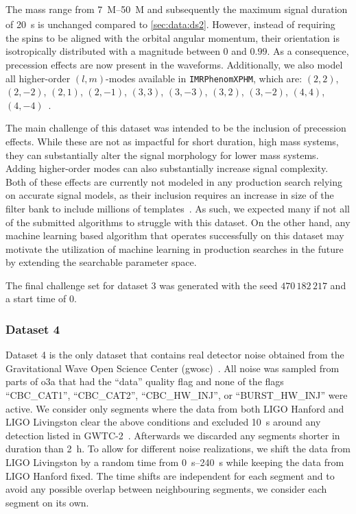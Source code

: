 The mass range from \SIrange{7}{50}{M_\odot} and subsequently the maximum signal duration of \SI{20}{\second} is unchanged compared to \autoref{sec:data:ds2}. However, instead of requiring the spins to be aligned with the orbital angular momentum, their orientation is isotropically distributed with a magnitude between $0$ and $0.99$. As a consequence, precession effects are now present in the waveforms. Additionally, we also model all higher-order $(l,m)$-modes available in \verb|IMRPhenomXPHM|, which are: $(2, 2)$, $(2, -2)$, $(2, 1)$, $(2, -1)$, $(3, 3)$, $(3, -3)$, $(3, 2)$, $(3, -2)$, $(4, 4)$, $(4, -4)$~\cite{Pratten:2020ceb}.

The main challenge of this dataset was intended to be the inclusion of precession effects. While these are not as impactful for short duration, high mass systems, they can substantially alter the signal morphology for lower mass systems. Adding higher-order modes can also substantially increase signal complexity. Both of these effects are currently not modeled in any production search relying on accurate signal models, as their inclusion requires an increase in size of the filter bank to include millions of templates~\cite{Harry:2016ijz, Harry:2017weg}. As such, we expected many if not all of the submitted algorithms to struggle with this dataset. On the other hand, any machine learning based algorithm that operates successfully on this dataset may motivate the utilization of machine learning in production searches in the future by extending the searchable parameter space.

The final challenge set for dataset 3 was generated with the seed $470\,182\,217$ and a start time of $0$.

\subsubsection{Dataset 4}
Dataset 4 is the only dataset that contains real detector noise obtained from the Gravitational Wave Open Science Center (\acrshort{gwosc})~\cite{LIGOScientific:2019lzm}. All noise was sampled from parts of \acrshort{o3a} that had the ``data'' quality flag and none of the flags ``CBC\_CAT1'', ``CBC\_CAT2'', ``CBC\_HW\_INJ'', or ``BURST\_HW\_INJ'' were active. We consider only segments where the data from both LIGO Hanford and LIGO Livingston clear the above conditions and excluded \SI{10}{\second} around any detection listed in GWTC-2~\cite{LIGOScientific:2020ibl}. Afterwards we discarded any segments shorter in duration than \SI{2}{\hour}. To allow for different noise realizations, we shift the data from LIGO Livingston by a random time from \SIrange{0}{240}{\second} while keeping the data from LIGO Hanford fixed. The time shifts are independent for each segment and to avoid any possible overlap between neighbouring segments, we consider each segment on its own.

